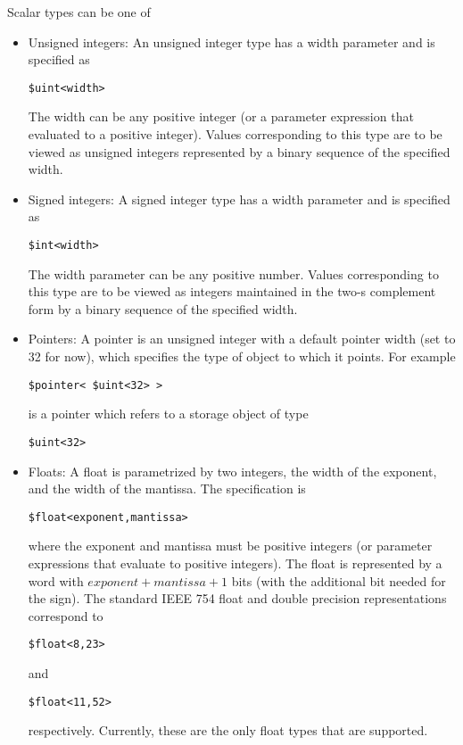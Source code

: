 \documentclass{article}
\begin{document}
Scalar types can be one of 
\begin{itemize}
\item Unsigned integers:  An unsigned integer type
has a width parameter and is specified as 
\begin{verbatim}
$uint<width>
\end{verbatim}
The width can be any positive integer (or a parameter
expression that evaluated to a positive integer).
Values corresponding to this type are to be
viewed as unsigned integers represented by 
a binary sequence of the specified width.
\item Signed integers:  A signed integer type
has a width parameter and is specified as 
\begin{verbatim}
$int<width>
\end{verbatim}
The width parameter can be any positive number.
Values corresponding to this type are to be
viewed as integers maintained in the
two-s complement form  by 
a binary sequence of the specified width.

\item Pointers:  A pointer is an unsigned
integer with a default pointer width
(set to 32 for now), which specifies the
type of object to which it points.
For example
\begin{verbatim}
$pointer< $uint<32> > 
\end{verbatim}
is a pointer which refers to a storage
object of type \begin{verbatim}$uint<32>\end{verbatim}
\item Floats: A float is parametrized by
two integers, the width of the exponent,
and the width of the mantissa.  
The specification is
\begin{verbatim}
$float<exponent,mantissa>
\end{verbatim} %
where the exponent and mantissa must be positive
integers (or parameter expressions that evaluate
to positive integers).  The float is represented by 
a word with $exponent+mantissa+1$ bits
(with the additional bit needed for the sign).
The standard IEEE 754 float and double
precision representations correspond
to
\begin{verbatim}
$float<8,23> 
\end{verbatim}
and
\begin{verbatim}
$float<11,52> 
\end{verbatim}
respectively.  Currently, these are the
only float types that are supported.
\end{itemize}
\end{document}
